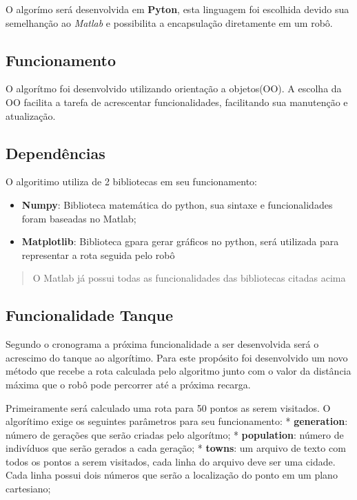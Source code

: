\documentclass[11pt]{article}
\providecommand{\tightlist}{%
      \setlength{\itemsep}{0pt}\setlength{\parskip}{0pt}}
\begin{document}
O algorímo será desenvolvida em \textbf{Pyton}, esta linguagem foi
escolhida devido sua semelhanção ao \emph{Matlab} e possibilita a
encapsulação diretamente em um robô.

    \subsection{Funcionamento}\label{funcionamento}

O algorítmo foi desenvolvido utilizando orientação a objetos(OO). A
escolha da OO facilita a tarefa de acrescentar funcionalidades,
facilitando sua manutenção e atualização.

\subsection{Dependências}\label{dependuxeancias}

O algoritimo utiliza de 2 bibliotecas em seu funcionamento:

\begin{itemize}
\tightlist
\item
  \textbf{Numpy}: Biblioteca matemática do python, sua sintaxe e
  funcionalidades foram baseadas no Matlab;
\item
  \textbf{Matplotlib}: Biblioteca gpara gerar gráficos no python, será
  utilizada para representar a rota seguida pelo robô
\end{itemize}

\begin{quote}
O Matlab já possui todas as funcionalidades das bibliotecas citadas
acima
\end{quote}

    \subsection{Funcionalidade Tanque}\label{funcionalidade-tanque}

Segundo o cronograma a próxima funcionalidade a ser desenvolvida será o
acrescimo do tanque ao algorítimo. Para este propósito foi desenvolvido
um novo método que recebe a rota calculada pelo algoritmo junto com o
valor da distância máxima que o robô pode percorrer até a próxima
recarga.

Primeiramente será calculado uma rota para 50 pontos as serem visitados.
O algorítimo exige os seguintes parâmetros para seu funcionamento: *
\textbf{generation}: número de gerações que serão criadas pelo
algorítmo; * \textbf{population}: número de indivíduos que serão gerados
a cada geração; * \textbf{towns}: um arquivo de texto com todos os
pontos a serem visitados, cada linha do arquivo deve ser uma cidade.
Cada linha possui dois números que serão a localização do ponto em um
plano cartesiano;
\end{document}
